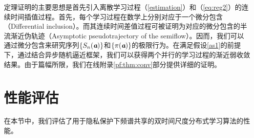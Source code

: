 定理证明的主要思想是首先引入离散学习过程（\ref{estimation}）和（\ref{eq:reg2}）的连续时间插值过程。首先，每个学习过程在数学上分别对应于一个微分包含（Differential inclusion）\cite{Yin}。而其连续时间差值过程可被证明为对应的微分包含的半流渐近伪轨迹（Asymptotic pseudotrajectory of the semiflow）。因而，我们可以通过微分包含来研究序列$\{S_n(\emph{\textbf{a}})\}$和$\{\pi(\emph{\textbf{a}})\}$的极限行为。在满足假设\ref{as1}的前提下，通过结合异步随机逼近框架\cite{Borkar1997}，我们可以获得两个并行的学习过程的渐近弱收敛结果。由于篇幅所限，我们在线附录\ref{pf:thm:conv}部分提供详细的证明。

\section{性能评估}\label{sec:simulation}
在本节中，我们评估了用于隐私保护下频谱共享的双时间尺度分布式学习算法的性能。
